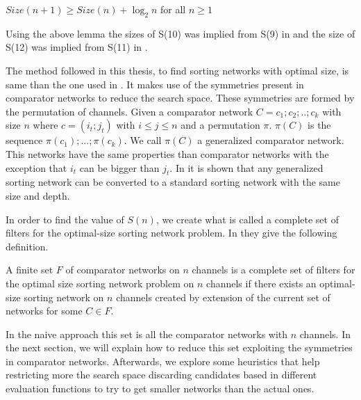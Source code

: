 \documentclass[../main.tex]{subfiles}
\begin{document}
	\begin{lemma}
		$Size(n+1) \geq Size(n) + \log_2 n$ for all $n \geq 1$
	\end{lemma}

	Using the above lemma the sizes of S(10) was implied from S(9) in \cite{sortingnineinputs} and the size of S(12) was implied from S(11) in \cite{harder2021answer}.
	
	The method followed in this thesis, to find sorting networks with optimal size, is same than the one used in \cite{sortingnineinputs}. It makes use of the symmetries present in comparator networks to reduce the search space. These symmetries are formed by the permutation of channels. Given a comparator network $C=c_1;c_2;..;c_k$ with size $n$ where $c=(i_t;j_t)$ with $i\leq j \leq n$ and a permutation $\pi$. $\pi(C)$ is the sequence $\pi(c_1);...;\pi(c_k)$. We call $\pi(C)$ a generalized comparator network. This networks have the same properties than comparator networks with the exception that $i_t$ can be bigger than $j_t$. In \cite{knuth1997art} it is shown that any generalized sorting network can be converted to a standard sorting network with the same size and depth.
	
	In order to find the value of $S(n)$, we create what is called a complete set of filters for the optimal-size sorting network problem. In \cite{sortingnineinputs} they give the following definition. 
	
	\begin{definition}
		A finite set $F$ of comparator networks on $n$ channels is a complete set of filters for the optimal size sorting network problem on $n$ channels if there exists an optimal-size sorting network on $n$ channels created by extension of the current set of networks for some $C \in F$.
	\end{definition}
	
	In the naive approach this set is all the comparator networks with $n$ channels. In the next section, we will explain how to reduce this set exploiting the symmetries in comparator networks. Afterwards, we explore some heuristics that help restricting more the search space discarding candidates based in different evaluation functions to try to get smaller networks than the actual ones.
\end{document}

